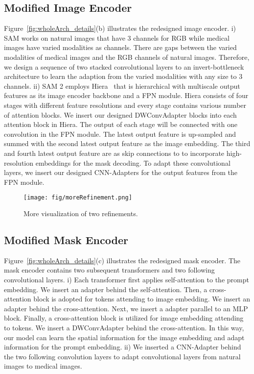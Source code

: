 \subsection{Modified Image Encoder}
Figure~\ref{fig:wholeArch_details}(b) illustrates the redesigned image encoder. i) SAM works on natural images that have 3 channels for RGB while medical images have varied modalities as channels. There are gaps between the varied modalities of medical images and the RGB channels of natural images. 
Therefore, we design a sequence of two stacked convolutional layers to an invert-bottleneck architecture to learn the adaption from the varied modalities with any size to 3 channels. 
ii) SAM 2 employs Hiera~\cite{ryali2023hiera} that is hierarchical with multiscale output features as its image encoder backbone and a FPN module. Hiera consists of four stages with different feature resolutions and every stage contains various number of attention blocks. We insert our designed DWConvAdapter blocks into each attention block in Hiera. The output of each stage will be connected with one convolution in the FPN module. The latest output feature is up-sampled and summed with the second latest output feature as the image embedding. The third and fourth latest output feature are as skip connections to to incorporate high-resolution embeddings for the mask decoding. To adapt these convolutional layers, we insert our designed CNN-Adapters for the output features from the FPN module. 

\begin{figure*}[!t]
\centering
  \vspace{-0.2cm}
\texttt{[image: fig/moreRefinement.png]}
      \caption{More visualization of two refinements.} 
\vspace{-0.2cm}
\label{fig:morerefinement}
\end{figure*}

\subsection{Modified Mask Encoder}
Figure~\ref{fig:wholeArch_details}(c) illustrates the redesigned mask encoder. The mask encoder contains two subsequent transformers and two following convolutional layers. i) Each transformer first applies self-attention to the prompt embedding. We insert an adapter behind the self-attention. Then, a cross-attention block is adopted for tokens attending to image embedding. We insert an adapter behind the cross-attention. Next, we insert a adapter parallel to an MLP block. Finally, a cross-attention block is utilized for image embedding attending to tokens. We insert a DWConvAdapter behind the cross-attention. In this way, our model can learn the spatial information for the image embedding and adapt information for the prompt embedding. 
ii) We inserted a CNN-Adapter behind the two following convolution layers to adapt convolutional layers from natural images to medical images. 

